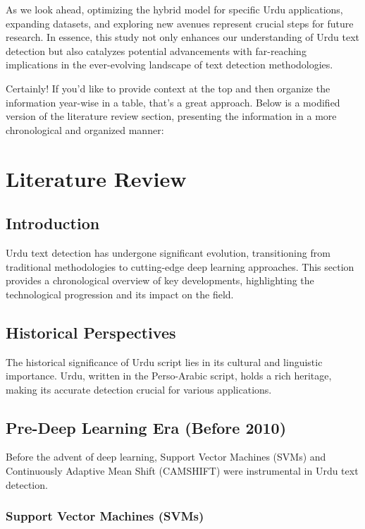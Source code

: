 \documentclass[default,iicol]{sn-jnl}%
\begin{document}
As we look ahead, optimizing the hybrid model for specific Urdu applications, expanding datasets, and exploring new avenues represent crucial steps for future research. In essence, this study not only enhances our understanding of Urdu text detection but also catalyzes potential advancements with far-reaching implications in the ever-evolving landscape of text detection methodologies.
\backmatter


Certainly! If you'd like to provide context at the top and then organize the information year-wise in a table, that's a great approach. Below is a modified version of the literature review section, presenting the information in a more chronological and organized manner:



	
	\section{Literature Review}
	
	\subsection{Introduction}
	
	Urdu text detection has undergone significant evolution, transitioning from traditional methodologies to cutting-edge deep learning approaches. This section provides a chronological overview of key developments, highlighting the technological progression and its impact on the field.
	
	\subsection{Historical Perspectives}
	
	The historical significance of Urdu script lies in its cultural and linguistic importance. Urdu, written in the Perso-Arabic script, holds a rich heritage, making its accurate detection crucial for various applications.
	
	\subsection{Pre-Deep Learning Era (Before 2010)}
	
	Before the advent of deep learning, Support Vector Machines (SVMs) and Continuously Adaptive Mean Shift (CAMSHIFT) were instrumental in Urdu text detection.
	
	\subsubsection{Support Vector Machines (SVMs)}
	
\end{document}
